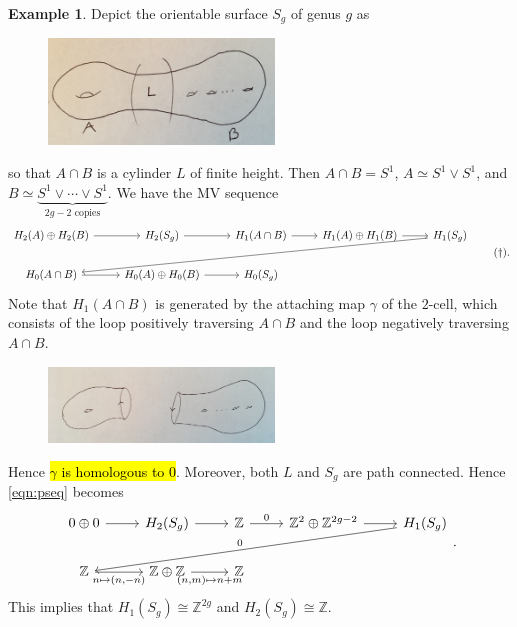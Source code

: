 \documentclass[10pt,letterpaper,cm]{nupset}
\theoremstyle{definition}
\newtheorem{exmp}[definition]{Example}
\theoremstyle{theorem}
\theoremstyle{remark}
\newcommand{\Z}{\mathbb Z}
\newcommand{\1}{\mathbb{1}}
\newcommand{\0}{\vec 0}
\begin{document}
\begin{exmp}
Depict the orientable surface $S_g$ of genus $g$ as 
\begin{figure}[H]
\centering
\includegraphics[width=60mm]{S_g-decomposed.jpg}
\end{figure}
so that $A \cap B$ is a cylinder $L$ of finite height. Then $A \cap B = S^1$, $A\simeq S^1 \vee S^1$, and $B\simeq \underbrace{S^1 \vee \cdots \vee S^1}_{2g-2 \text{ copies}}$. We have the MV sequence 
\[ \label{eqn:pseq}
\begin{tikzcd} 
H_2(A) \oplus H_2(B) \arrow[r] & H_2(S_g) \arrow[r]             & H_1(A\cap B) \arrow[r] & H_1(A)\oplus H_1(B) \arrow[r] & H_1(S_g) \arrow[lllld] \\
H_0(A \cap B) \arrow[r]        & H_0(A) \oplus H_0(B) \arrow[r] & H_0(S_g)               &                               &                       
\end{tikzcd} \tag{$\dagger$}
.\] Note that $H_1(A\cap B)$ is generated by the attaching map $\gamma$ of the $2$-cell, which consists of the loop positively traversing $A\cap B$ and the loop negatively traversing $A\cap B$. 
\begin{figure}[H]
\centering
\includegraphics[width=60mm]{S_g-cut.jpg}
\end{figure}
Hence \hl{$\gamma$ is homologous to $0$}. Moreover, both $L$ and $S_g$ are path connected. Hence \eqref{eqn:pseq} becomes 
\[
\begin{tikzcd}
0\oplus 0 \arrow[r]                 & H_2(S_g) \arrow[r]                                  & \Z \arrow[r, "0"] & \Z^2 \oplus \Z^{2g-2} \arrow[r] & H_1(S_g) \arrow[lllld, "0"'] \\
\Z \arrow[r, "{n\mapsto (n, -n)}"'] & \Z \oplus \Z \arrow[r, "{(n,m)\mapsto n+m}"'] & \Z                &                                 &                             
\end{tikzcd}
.\] This implies that $H_1(S_g) \cong \Z^{2g}$ and $H_2(S_g) \cong \Z$.
\end{exmp}
\end{document}
